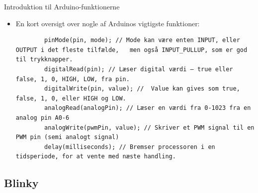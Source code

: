 \documentclass{beamer}
\begin{document}
\begin{frame}[fragile]{Introduktion til Arduino-funktionerne}
	\begin{itemize}
		\item{En kort oversigt over nogle af Arduinos vigtigste funktioner:}
		\begin{lstlisting}
		pinMode(pin, mode); // Mode kan være enten INPUT, eller OUTPUT i det fleste tilfælde, 	men også INPUT_PULLUP, som er god til trykknapper.
		digitalRead(pin); // Læser digital værdi – true eller false, 1, 0, HIGH, LOW, fra pin.
		digitalWrite(pin, value); //  Value kan gives som true, false, 1, 0, eller HIGH og LOW.
		analogRead(analogPin); // Læser en værdi fra 0-1023 fra en analog pin A0-6
		analogWrite(pwmPin, value); // Skriver et PWM signal til en PWM pin (semi analogt signal)
		delay(milliseconds); // Bremser processoren i en tidsperiode, for at vente med næste handling.
		\end{lstlisting}
	\end{itemize}
\end{frame}

\subsection{Blinky}
\end{document}
